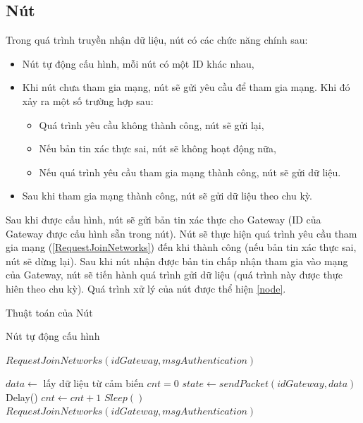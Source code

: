 \subsection{Nút} 
Trong quá trình truyền nhận dữ liệu, nút có các chức năng chính sau:
\begin{itemize}
\item	Nút tự động cấu hình, mỗi nút có một ID khác nhau,
\item	Khi nút chưa tham gia mạng, nút sẽ gửi yêu cầu để tham gia mạng. Khi đó xảy ra một số trường hợp sau:
	\begin{itemize}
	\item	Quá trình yêu cầu không thành công, nút sẽ gửi lại,
	\item	Nếu bản tin xác thực sai, nút sẽ không hoạt động nữa,
	\item	Nếu quá trình yêu cầu tham gia mạng thành công, nút sẽ gửi dữ liệu.
	\end{itemize}
\item	Sau khi tham gia mạng thành công, nút sẽ gửi dữ liệu theo chu kỳ.
\end{itemize}
Sau khi được cấu hình, nút sẽ gửi bản tin xác thực cho Gateway (ID của Gateway được cấu hình sẵn trong nút). Nút sẽ thực hiện quá trình yêu cầu tham gia mạng (\ref{RequestJoinNetworks}) đến khi thành công (nếu bản tin xác thực sai, nút sẽ dừng lại). Sau khi nút nhận được bản tin chấp nhận tham gia vào mạng của Gateway, nút sẽ tiến hành quá trình gửi dữ liệu (quá trình này được thực hiên theo chu kỳ). Quá trình xử lý của nút được thể hiện \ref{node}{}.
\begin{center}
\begin{algorithm}[h]
	\caption{Thuật toán của Nút}
	\label{node}
	\begin{algorithmic}[1]
		\State Nút tự động cấu hình  
		
		 
		
		\State $RequestJoinNetworks(idGateway, msgAuthentication)$
		
				\State $data \gets$ lấy dữ liệu từ cảm biến
				\State $cnt = 0$
				\Repeat
					\State $state \gets sendPacket(idGateway, data)$ 
						\State Delay()
					\EndIf
					\State $cnt \gets cnt + 1$
				 
				\State $Sleep()$ 
				\Else
					\State $RequestJoinNetworks(idGateway, msgAuthentication)$
				\EndIf
		\EndWhile
	\end{algorithmic}
\end{algorithm}
\end{center}

